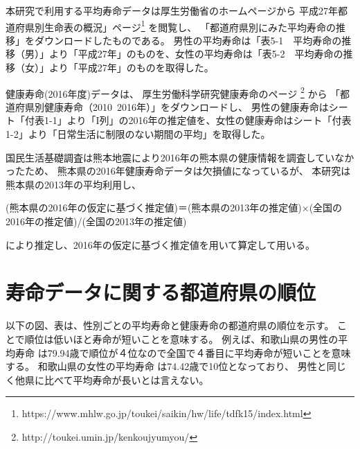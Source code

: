 本研究で利用する平均寿命データは厚生労働省のホームページから
平成27年都道府県別生命表の概況」ページ\footnote{https://www.mhlw.go.jp/toukei/saikin/hw/life/tdfk15/index.html}
を閲覧し、
「都道府県別にみた平均寿命の推移」をダウンロードしたものである。
男性の平均寿命は「表5-1　平均寿命の推移（男）」より「平成27年」のものを、女性の平均寿命は「表5-2　平均寿命の推移（女）」より「平成27年」のものを取得した。


健康寿命(2016年度)データは、
厚生労働科学研究健康寿命のページ
\footnote{http://toukei.umin.jp/kenkoujyumyou/}
から
「都道府県別健康寿命（2010~2016年）」をダウンロードし、
男性の健康寿命はシート「付表1-1」より「I列」の2016年の推定値を、女性の健康寿命はシート「付表1-2」より「日常生活に制限のない期間の平均」を取得した。

国民生活基礎調査は熊本地震により2016年の熊本県の健康情報を調査していなかったため、
熊本県の2016年健康寿命データは欠損値になっているが、
本研究は熊本県の2013年の平均利用し、

\begin{center}
	(熊本県の2016年の仮定に基づく推定値)＝(熊本県の2013年の推定値)×(全国の2016年の推定値)/(全国の2013年の推定値)
\end{center}

により推定し、2016年の仮定に基づく推定値を用いて算定して用いる。




\newpage

\section{寿命データに関する都道府県の順位}

以下の図、表は、性別ごとの平均寿命と健康寿命の都道府県の順位を示す。
ことで順位は低いほと寿命が短いことを意味する。
例えば、和歌山県の男性の平均寿命
は79.94歳で順位が４位なので全国で４番目に平均寿命が短いことを意味する。
和歌山県の女性の平均寿命
は74.42歳で10位となっており、
男性と同じく他県に比べて平均寿命が長いとは言えない。


